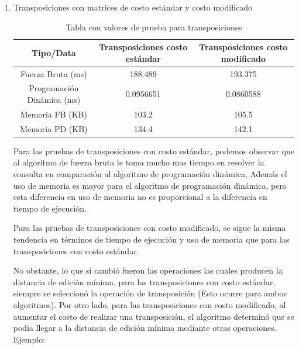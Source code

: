 \begin{enumerate}
    \item Transposiciones con matrices de costo estándar y costo modificado
    
        \begin{table}[H]
        \centering
        \begin{tabular}{|c|c|c|}
        \hline
        \textbf{Tipo/Data} & \textbf{Transposiciones costo estándar} & \textbf{Transposiciones costo modificado}\\ \hline
        Fuerza Bruta (ms) & 188.489 & 193.375\\ \hline
        Programación Dinámica (ms) & 0.0956651 & 0.0860588 \\ \hline
        Memoria FB (KB) & 103.2 & 105.5   \\ \hline
        Memoria PD (KB) & 134.4 & 142.1 \\ \hline
        
        \end{tabular}
        \caption{Tabla con valores de prueba para transposiciones}
        \label{tab:tabla1}
        \end{table}


    Para las pruebas de transposiciones con costo estándar, podemos observar que 
    al algoritmo de fuerza bruta le toma mucho mas tiempo en resolver
    la consulta en comparación al algoritmo de programación dinámica,
    Además el uso de memoria es mayor para el algoritmo de programación dinámica, 
    pero esta diferencia en uso de memoria no es proporcional a la diferencia
    en tiempo de ejecución.

    Para las pruebas de transposiciones con costo modificado, se sigue la misma tendencia
    en términos de tiempo de ejecución y uso de memoria que para las transposiciones con
    costo estándar.

    No obstante, lo que si cambió fueron las operaciones las cuales producen la distancia
    de edición mínima, para las transposiciones con costo estándar, siempre se seleccionó
    la operación de transposición (Esto ocurre para ambos algoritmos). Por otro lado, para las transposiciones con costo modificado, al aumentar
    el costo de realizar una transposición, el algoritmo determinó que
    se podia llegar a la distancia de edición mínima mediante otras operaciones.
    Ejemplo:

    \begin{figure}[H]
        \centering
      

\end{figure}
\end{enumerate}
